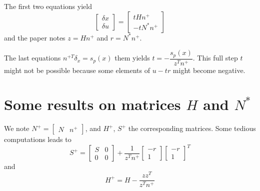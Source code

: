\documentclass[11pt,a4paper]{article}
\newcommand{\BIN}{\begin{bmatrix}}
\newcommand{\BOUT}{\end{bmatrix}}
\begin{document}
The first two equations yield
\begin{equation}
	\BIN \delta x \\ \delta u \BOUT = \BIN t H n^+ \\ -t N^* n^+ \BOUT 
\end{equation}
and the paper notes $z = H n^+$ and $r = N^* n^+$.

The last equations $ n^{+T} \delta_x = s_p(x)$ them yields $t = -\dfrac{s_p(x)}{z^Tn^+}$. This full step $t$ might not be possible because some elements of $u - tr$ might become negative.

\section{Some results on matrices $H$ and $N^*$}
We note $N^+ = \BIN N & n^+\BOUT$, and $H^+$, $S^+$ the corresponding matrices.
Some tedious computations leads to
\begin{equation}
	S^+ = \BIN S & 0 \\ 0 & 0 \BOUT + \frac{1}{z^T n^+} \BIN -r \\ 1\BOUT \BIN -r \\ 1\BOUT^T
\end{equation}
and 
\begin{equation}
	H^+ = H - \frac{z z^T}{z^T n^+}
\end{equation}

%
\end{document}
